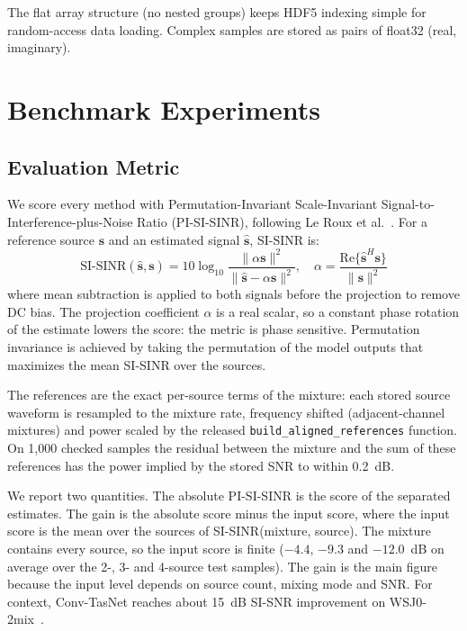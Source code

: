 \documentclass[journal]{IEEEtran}
\begin{document}
The flat array structure (no nested groups) keeps HDF5 indexing simple for
random-access data loading. Complex samples are stored as pairs of float32
(real, imaginary).

\section{Benchmark Experiments}
\label{sec:benchmark}

\subsection{Evaluation Metric}
\label{sec:metrics}

We score every method with Permutation-Invariant Scale-Invariant
Signal-to-Interference-plus-Noise Ratio (PI-SI-SINR), following Le Roux et
al.~\cite{leroux2019sdr}. For a reference source $\mathbf{s}$ and an
estimated signal $\hat{\mathbf{s}}$, SI-SINR is:
\begin{equation}
\text{SI-SINR}(\hat{\mathbf{s}},\mathbf{s})
  = 10\log_{10}\frac{\|\alpha\mathbf{s}\|^2}
    {\|\hat{\mathbf{s}} - \alpha\mathbf{s}\|^2},\quad
  \alpha = \frac{\mathrm{Re}\{\hat{\mathbf{s}}^{H}\mathbf{s}\}}{\|\mathbf{s}\|^2}
\label{eq:sisinr}
\end{equation}
where mean subtraction is applied to both signals before the projection to remove
DC bias. The projection coefficient $\alpha$ is a real scalar, so a constant phase
rotation of the estimate lowers the score: the metric is phase sensitive.
Permutation invariance is achieved by taking the permutation of the model outputs
that maximizes the mean SI-SINR over the sources.

The references are the exact per-source terms of the mixture: each stored source
waveform is resampled to the mixture rate, frequency shifted (adjacent-channel
mixtures) and power scaled by the released \texttt{build\_aligned\_references}
function. On 1,000 checked samples the residual between the mixture and the sum of
these references has the power implied by the stored SNR to within 0.2~dB.

We report two quantities. The absolute PI-SI-SINR is the score of the separated
estimates. The gain is the absolute score minus the input score, where the input
score is the mean over the sources of SI-SINR(mixture, source). The mixture contains
every source, so the input score is finite ($-4.4$, $-9.3$ and $-12.0$~dB on average over the
2-, 3- and 4-source test samples). The gain is the main figure because the input level
depends on source count, mixing mode and SNR. For context, Conv-TasNet reaches about
15~dB SI-SNR improvement on WSJ0-2mix~\cite{luo2019conv}.
\end{document}
